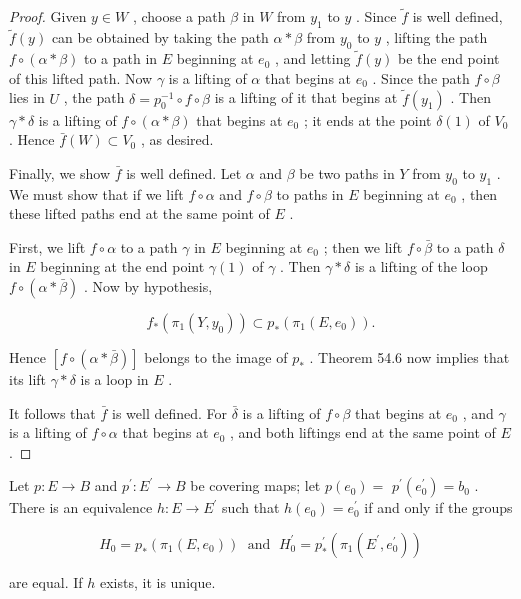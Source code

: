 \begin{proof}
Given \(y \in  W\) , choose a path \(\beta\) in \(W\) from \({y}_{1}\) to \(y\) . Since \(\widetilde{f}\) is well defined, \(\widetilde{f}\left( y\right)\) can be obtained by taking the path \(\alpha  * \beta\) from \({y}_{0}\) to \(y\) , lifting the path \(f \circ  \left( {\alpha  * \beta }\right)\) to a path in \(E\) beginning at \({e}_{0}\) , and letting \(\widetilde{f}\left( y\right)\) be the end point of this lifted path. Now \(\gamma\) is a lifting of \(\alpha\) that begins at \({e}_{0}\) . Since the path \(f \circ  \beta\) lies in \(U\) , the path \(\delta  = {p}_{0}^{-1} \circ  f \circ  \beta\) is a lifting of it that begins at \(\widetilde{f}\left( {y}_{1}\right)\) . Then \(\gamma  * \delta\) is a lifting of \(f \circ  \left( {\alpha  * \beta }\right)\) that begins at \({e}_{0}\) ; it ends at the point \(\delta \left( 1\right)\) of \({V}_{0}\) . Hence \(\bar{f}\left( W\right)  \subset  {V}_{0}\) , as desired.

Finally, we show \(\bar{f}\) is well defined. Let \(\alpha\) and \(\beta\) be two paths in \(Y\) from \({y}_{0}\) to \({y}_{1}\) . We must show that if we lift \(f \circ  \alpha\) and \(f \circ  \beta\) to paths in \(E\) beginning at \({e}_{0}\) , then these lifted paths end at the same point of \(E\) .

First, we lift \(f \circ  \alpha\) to a path \(\gamma\) in \(E\) beginning at \({e}_{0}\) ; then we lift \(f \circ  \bar{\beta }\) to a path \(\delta\) in \(E\) beginning at the end point \(\gamma \left( 1\right)\) of \(\gamma\) . Then \(\gamma  * \delta\) is a lifting of the loop \(f \circ  \left( {\alpha  * \bar{\beta }}\right)\) . Now by hypothesis,

\[
{f}_{ * }\left( {{\pi }_{1}\left( {Y,{y}_{0}}\right) }\right)  \subset  {p}_{ * }\left( {{\pi }_{1}\left( {E,{e}_{0}}\right) }\right) .
\]

Hence \(\left\lbrack  {f \circ  \left( {\alpha  * \bar{\beta }}\right) }\right\rbrack\) belongs to the image of \({p}_{ * }\) . Theorem 54.6 now implies that its lift \(\gamma  * \delta\) is a loop in \(E\) .

It follows that \(\bar{f}\) is well defined. For \(\bar{\delta }\) is a lifting of \(f \circ  \beta\) that begins at \({e}_{0}\) , and \(\gamma\) is a lifting of \(f \circ  \alpha\) that begins at \({e}_{0}\) , and both liftings end at the same point of \(E\) .
\end{proof}
\begin{theorem} Let \(p : E \rightarrow  B\) and \({p}^{\prime } : {E}^{\prime } \rightarrow  B\) be covering maps; let \(p\left( {e}_{0}\right)  =\)  \({p}^{\prime }\left( {e}_{0}^{\prime }\right)  = {b}_{0}\) . There is an equivalence \(h : E \rightarrow  {E}^{\prime }\) such that \(h\left( {e}_{0}\right)  = {e}_{0}^{\prime }\) if and only if the groups

\[
{H}_{0} = {p}_{ * }\left( {{\pi }_{1}\left( {E,{e}_{0}}\right) }\right) \;\text{ and }\;{H}_{0}^{\prime } = {p}_{ * }^{\prime }\left( {{\pi }_{1}\left( {{E}^{\prime },{e}_{0}^{\prime }}\right) }\right)
\]

are equal. If \(h\) exists, it is unique.
\end{theorem}

